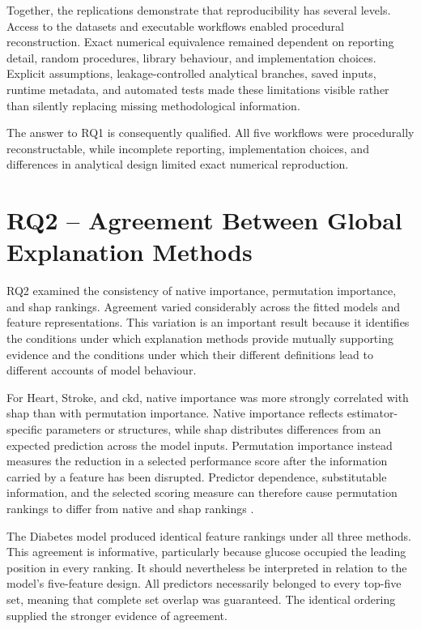 Together, the replications demonstrate that reproducibility has several levels. Access to the datasets and executable workflows enabled procedural reconstruction. Exact numerical equivalence remained dependent on reporting detail, random procedures, library behaviour, and implementation choices. Explicit assumptions, leakage-controlled analytical branches, saved inputs, runtime metadata, and automated tests made these limitations visible rather than silently replacing missing methodological information.

The answer to RQ1 is consequently qualified. All five workflows were procedurally reconstructable, while incomplete reporting, implementation choices, and differences in analytical design limited exact numerical reproduction.

\section{RQ2 -- Agreement Between Global Explanation Methods}

RQ2 examined the consistency of native importance, permutation importance, and \gls{shap} rankings. Agreement varied considerably across the fitted models and feature representations. This variation is an important result because it identifies the conditions under which explanation methods provide mutually supporting evidence and the conditions under which their different definitions lead to different accounts of model behaviour.

For Heart, Stroke, and \gls{ckd}, native importance was more strongly correlated with \gls{shap} than with permutation importance. Native importance reflects estimator-specific parameters or structures, while \gls{shap} distributes differences from an expected prediction across the model inputs. Permutation importance instead measures the reduction in a selected performance score after the information carried by a feature has been disrupted. Predictor dependence, substitutable information, and the selected scoring measure can therefore cause permutation rankings to differ from native and \gls{shap} rankings \citep{fisher_models_2019, strobl_conditional_2008, NIPS2017_8a20a862, vilone_classification_2021}.

The Diabetes model produced identical feature rankings under all three methods. This agreement is informative, particularly because glucose occupied the leading position in every ranking. It should nevertheless be interpreted in relation to the model's five-feature design. All predictors necessarily belonged to every top-five set, meaning that complete set overlap was guaranteed. The identical ordering supplied the stronger evidence of agreement.

